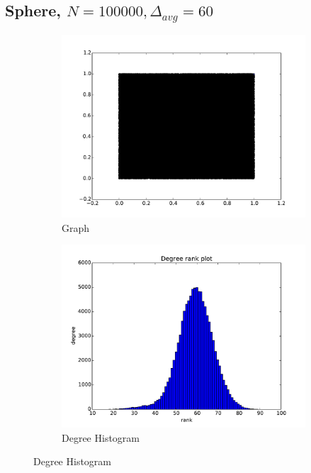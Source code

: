 \documentclass[oneside, titlepage]{scrartcl}
\begin{document}
\subsection{Sphere, $N=100000, \Delta_{avg}=60$}
\begin{figure}[!h]
\centering
\begin{subfigure}{0.5\textwidth}
	\centering
	\includegraphics[width=0.9\linewidth]{figures/graph40.pdf}
	\caption{Graph}
\end{subfigure}%
\begin{subfigure}{0.5\textwidth}
	\centering
	\includegraphics[width=0.9\linewidth]{figures/degrees40.pdf}
	\caption{Degree Histogram}
\end{subfigure}


\end{figure}
\end{document}
